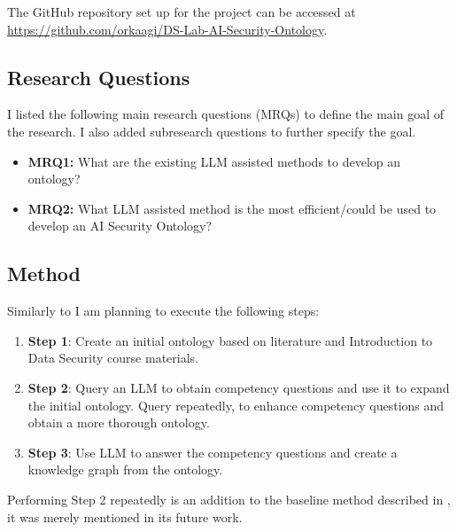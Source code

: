 \documentclass{article}
\begin{document}
The GitHub repository set up for the project can be accessed at \href{https://github.com/orkaagi/DS-Lab-AI-Security-Ontology}{https://github.com/orkaagi/DS-Lab-AI-Security-Ontology}.

\subsection{Research Questions}

I listed the following main research questions (MRQs) to define the main goal of the research. I also added subresearch questions to further specify the goal.

\begin{itemize}
    \item \textbf{MRQ1:} What are the existing LLM assisted methods to develop an ontology?
    \item \textbf{MRQ2:} What LLM assisted method is the most efficient/could be used to develop an AI Security Ontology?
\end{itemize}

\subsection{Method}

Similarly to \cite{Yang2024} I am planning to execute the following steps:

\begin{enumerate}
    \item \textbf{Step 1}: Create an initial ontology based on literature and Introduction to Data Security course materials.
    \item \textbf{Step 2}: Query an LLM to obtain competency questions and use it to expand the initial ontology. Query repeatedly, to enhance competency questions and obtain a more thorough ontology. 
    \item \textbf{Step 3}: Use LLM to answer the competency questions and create a knowledge graph from the ontology.
\end{enumerate}

Performing Step 2 repeatedly is an addition to the baseline method described in \cite{Yang2024}, it was merely mentioned in its future work.


\end{document}

